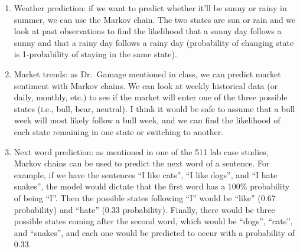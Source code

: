 \documentclass[
]{article}
\begin{document}
\begin{enumerate}
\def\labelenumi{\arabic{enumi}.}
\item
  Weather prediction: if we want to predict whether it'll be sunny or
  rainy in summer, we can use the Markov chain. The two states are sun
  or rain and we look at past observations to find the likelihood that a
  sunny day follows a sunny and that a rainy day follows a rainy day
  (probability of changing state is 1-probability of staying in the same
  state).
\item
  Market trends: as Dr.~Gamage mentioned in class, we can predict market
  sentiment with Markov chains. We can look at weekly historical data
  (or daily, monthly, etc.) to see if the market will enter one of the
  three possible states (i.e., bull, bear, neutral). I think it would be
  safe to assume that a bull week will most likely follow a bull week,
  and we can find the likelihood of each state remaining in one state or
  switching to another.
\item
  Next word prediction: as mentioned in one of the 511 lab case studies,
  Markov chains can be used to predict the next word of a sentence. For
  example, if we have the sentences ``I like cats'', ``I like dogs'',
  and ``I hate snakes'', the model would dictate that the first word has
  a 100\% probability of being ``I''. Then the possible states following
  ``I'' would be ``like'' (0.67 probability) and ``hate'' (0.33
  probability). Finally, there would be three possible states coming
  after the second word, which would be ``dogs'', ``cats'', and
  ``snakes'', and each one would be predicted to occur with a
  probability of 0.33.
\end{enumerate}
\end{document}
